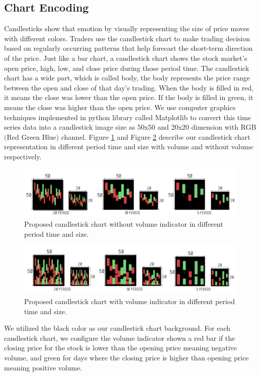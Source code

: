 \documentclass[10pt,twocolumn]{article}
\begin{document}
\subsection{Chart Encoding}
Candlesticks show that emotion by visually representing the size of price moves with different colors. Traders use the candlestick chart to make trading decision based on regularly occurring patterns that help forecast the short-term direction of the price. Just like a bar chart, a candlestick chart shows the stock market’s open price, high, low, and close price during those period time. The candlestick chart has a wide part, which is called body, the body represents the price range between the open and close of that day’s trading. When the body is filled in red, it means the close was lower than the open price. If the body is filled in green, it means the close was higher than the open price. 
We use computer graphics techniques implemented in python library called Matplotlib\cite{hunter2007matplotlib} to convert this time series data into a candlestick image size as 50x50 and 20x20 dimension with RGB$($Red Green Blue$)$ channel.
Figure \ref{fig:candlewithoutvolume} and Figure \ref{fig:candlewithvolume} describe our candlestick chart representation in different period time and size with volume and without volume respectively.
\begin{figure}
  \includegraphics[width=\linewidth]{figures/candlewithoutvolume.png}
  \caption{Proposed candlestick chart without volume indicator in different period time and size.}
  \label{fig:candlewithoutvolume}
\end{figure}
\begin{figure}
  \includegraphics[width=\linewidth]{figures/candlewithvolume.png}
  \caption{Proposed candlestick chart with volume indicator in different period time and size.}
  \label{fig:candlewithvolume}
\end{figure}
\par
We utilized the black color as our candlestick chart background. For each candlestick chart, we configure the volume indicator shown a red bar if the closing price for the stock is lower than the opening price meaning negative volume, and green for days where the closing price is higher than opening price meaning positive volume.
\end{document}
